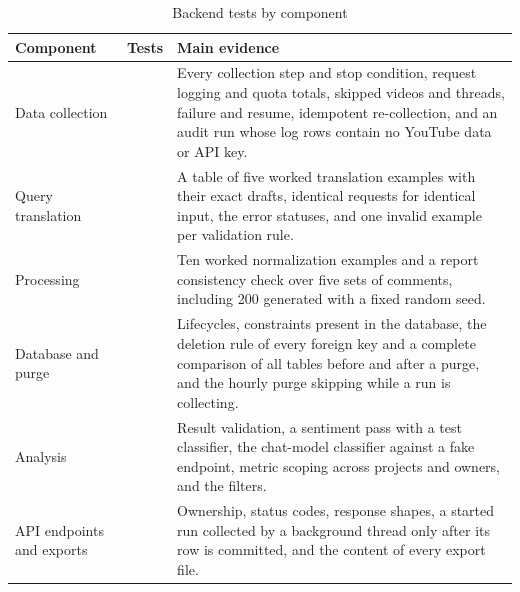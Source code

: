 \begingroup
{}
\begin{table}[htbp]
    \centering
    \footnotesize
    \caption{Backend tests by component}
    \label{tab:backend_tests}
    \begin{tabularx}
        {\textwidth}{>{\raggedright\arraybackslash}p{3.4cm}>{\raggedleft\arraybackslash}p{1.0cm}X}
        \toprule
        \textbf{Component}         & \textbf{Tests} & \textbf{Main evidence}                                                                                                                                                                                                    \\
        \midrule
        Data collection            & 98             & Every collection step and stop condition, request logging and quota totals, skipped videos and threads, failure and resume, idempotent re-collection, and an audit run whose log rows contain no YouTube data or API key. \\
        \midrule
        Query translation          & 65             & A table of five worked translation examples with their exact drafts, identical requests for identical input, the error statuses, and one invalid example per validation rule.                                             \\
        \midrule
        Processing                 & 20             & Ten worked normalization examples and a report consistency check over five sets of comments, including 200 generated with a fixed random seed.                                                                            \\
        \midrule
        Database and purge         & 57             & Lifecycles, constraints present in the database, the deletion rule of every foreign key and a complete comparison of all tables before and after a purge, and the hourly purge skipping while a run is collecting.        \\
        \midrule
        Analysis                   & 87             & Result validation, a sentiment pass with a test classifier, the chat-model classifier against a fake endpoint, metric scoping across projects and owners, and the filters.                                                \\
        \midrule
        API endpoints and exports  & 78             & Ownership, status codes, response shapes, a started run collected by a background thread only after its row is committed, and the content of every export file.                                                           \\

\end{tabularx}
\end{table}
